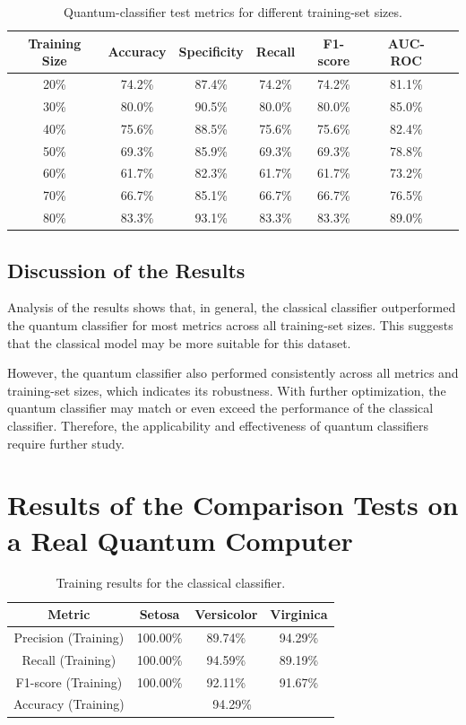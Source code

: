 \begin{table}[H]
\centering
\caption{Quantum-classifier test metrics for different training-set sizes.}
\small
\begin{tabular}{|c|c|c|c|c|c|c|}
\hline
\textbf{Training Size} & \textbf{Accuracy} & \textbf{Specificity} & \textbf{Recall} & \textbf{F1-score} & \textbf{AUC-ROC} \\ \hline
20\% & 74.2\% & 87.4\% & 74.2\% & 74.2\% & 81.1\% \\ \hline
30\% & 80.0\% & 90.5\% & 80.0\% & 80.0\% & 85.0\% \\ \hline
40\% & 75.6\% & 88.5\% & 75.6\% & 75.6\% & 82.4\% \\ \hline
50\% & 69.3\% & 85.9\% & 69.3\% & 69.3\% & 78.8\% \\ \hline
60\% & 61.7\% & 82.3\% & 61.7\% & 61.7\% & 73.2\% \\ \hline
70\% & 66.7\% & 85.1\% & 66.7\% & 66.7\% & 76.5\% \\ \hline
80\% & 83.3\% & 93.1\% & 83.3\% & 83.3\% & 89.0\% \\ \hline
\end{tabular}
\end{table}

\subsection{Discussion of the Results}

Analysis of the results shows that, in general, the classical classifier outperformed the quantum classifier for most metrics across all training-set sizes. This suggests that the classical model may be more suitable for this dataset.

However, the quantum classifier also performed consistently across all metrics and training-set sizes, which indicates its robustness. With further optimization, the quantum classifier may match or even exceed the performance of the classical classifier. Therefore, the applicability and effectiveness of quantum classifiers require further study.

\section{Results of the Comparison Tests on a Real Quantum Computer}

\begin{table}[H]
\centering
\caption{Training results for the classical classifier.}
\small
\begin{tabular}{|c|c|c|c|}
\hline
\textbf{Metric} & \textbf{Setosa} & \textbf{Versicolor} & \textbf{Virginica} \\ \hline
Precision (Training) & 100.00\% & 89.74\% & 94.29\% \\ \hline
Recall (Training) & 100.00\% & 94.59\% & 89.19\% \\ \hline
F1-score (Training) & 100.00\% & 92.11\% & 91.67\% \\ \hline
Accuracy (Training) & \multicolumn{3}{|c|}{94.29\%} \\ \hline
\end{tabular}
\end{table}

